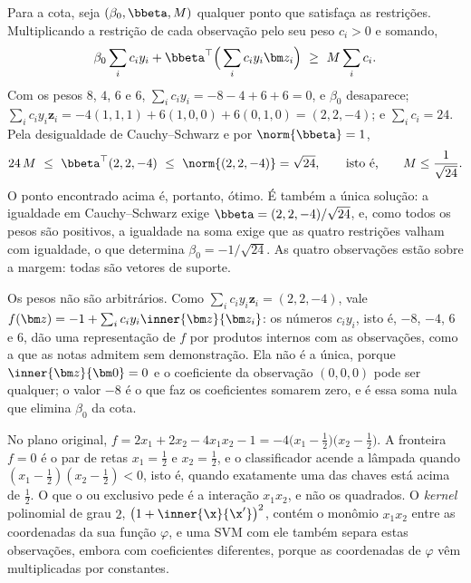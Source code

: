 \begin{solucao}
Para a cota, seja $(\beta_0,\bbeta,M)$ qualquer ponto que satisfaça as restrições.
Multiplicando a restrição de cada observação pelo seu peso $c_i>0$ e somando,
\[
  \beta_0\sum_ic_iy_i+\bbeta^\top\Big(\sum_ic_iy_i\bm z_i\Big)\ \ge\ M\sum_ic_i .
\]
Com os pesos $8$, $4$, $6$ e $6$, $\sum_ic_iy_i=-8-4+6+6=0$, e $\beta_0$ desaparece;
$\sum_ic_iy_i\bm z_i=-4(1,1,1)+6(1,0,0)+6(0,1,0)=(2,2,-4)$; e $\sum_ic_i=24$. Pela
desigualdade de Cauchy--Schwarz e por $\norm{\bbeta}=1$,
\[
  24\,M\ \le\ \bbeta^\top(2,2,-4)\ \le\ \norm{(2,2,-4)}=\sqrt{24},
  \qquad\text{isto é,}\qquad M\le\frac1{\sqrt{24}} .
\]
O ponto encontrado acima é, portanto, ótimo. É também a única solução: a igualdade em
Cauchy--Schwarz exige $\bbeta=(2,2,-4)/\sqrt{24}$, e, como todos os pesos são positivos, a
igualdade na soma exige que as quatro restrições valham com igualdade, o que determina
$\beta_0=-1/\sqrt{24}$. As quatro observações estão sobre a margem: todas são vetores de
suporte.

Os pesos não são arbitrários. Como $\sum_ic_iy_i\bm z_i=(2,2,-4)$, vale
$f(\bm z)=-1+\sum_ic_iy_i\inner{\bm z}{\bm z_i}$: os números $c_iy_i$, isto é, $-8$, $-4$, $6$
e $6$, dão uma representação de $f$ por produtos internos com as observações, como a que as
notas admitem sem demonstração. Ela não é a única, porque $\inner{\bm z}{\bm 0}=0$ e o
coeficiente da observação $(0,0,0)$ pode ser qualquer; o valor $-8$ é o que faz os
coeficientes somarem zero, e é essa soma nula que elimina $\beta_0$ da cota.

No plano original, $f=2x_1+2x_2-4x_1x_2-1=-4\big(x_1-\tfrac12\big)\big(x_2-\tfrac12\big)$. A
fronteira $f=0$ é o par de retas $x_1=\tfrac12$ e $x_2=\tfrac12$, e o classificador acende a
lâmpada quando $(x_1-\tfrac12)(x_2-\tfrac12)<0$, isto é, quando exatamente uma das chaves está
acima de $\tfrac12$. O que o ou exclusivo pede é a interação $x_1x_2$, e não os quadrados. O
\emph{kernel} polinomial de grau $2$, $\big(1+\inner{\x}{\x'}\big)^2$, contém o monômio $x_1x_2$
entre as coordenadas da sua função $\varphi$, e uma SVM com ele também separa estas
observações, embora com coeficientes diferentes, porque as coordenadas de $\varphi$ vêm
multiplicadas por constantes.
\end{solucao}
